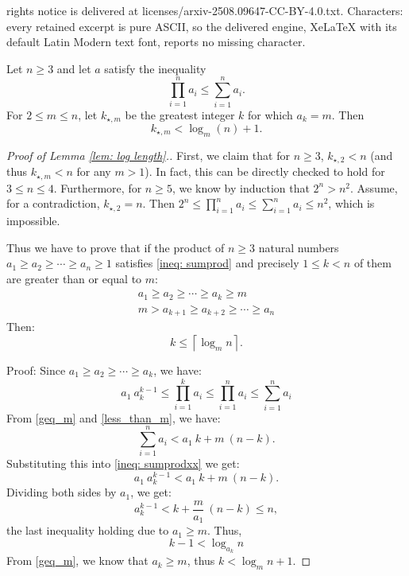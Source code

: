 \documentclass[10pt,a4paper]{amsart}
\newcommand{\ceil}[1]{\left\lceil #1 \right\rceil}
\begin{document}
rights notice is delivered at licenses/arxiv-2508.09647-CC-BY-4.0.txt. Characters: every retained excerpt is pure ASCII, so the delivered engine, XeLaTeX with its default Latin Modern text font, reports no missing character.
\begin{lemma}\label{lem: log length}
Let $n\geq 3$ and let $a$ satisfy the inequality
\begin{equation}\label{ineq: sumprod}
\prod_{i=1}^n a_i\leq\sum_{i=1}^n a_i.
\end{equation}
For $2\leq m\leq n$, let $k_{\star,m}$ be the greatest integer $k$ for which $a_k=m$. Then
\begin{equation}\label{eq: log}
k_{\star,m}< \log_m(n)+1.
\end{equation}
\end{lemma}

\begin{proof}[Proof of Lemma \ref{lem: log length}.]
First, we claim that for $n\geq 3$, $k_{\star,2}<n$ (and thus $k_{\star,m}<n$ for any $m>1$). In fact, this can be directly checked to hold for $3\leq n\leq 4$. Furthermore, for $n\geq 5$, we know by induction that $2^n>n^2$. Assume, for a contradiction, $k_{\star,2}=n$. Then $2^n\leq \prod_{i=1}^n a_i\leq\sum_{i=1}^na_i\leq n^2$, which is impossible. 

Thus we have to prove that if the product of $n \geq 3$ natural numbers $a_1 \geq a_2 \geq \cdots \geq a_n \geq 1$ satisfies \eqref{ineq: sumprod} and precisely $1\leq k<n$ of them are greater than or equal to $m$:
    \begin{gather}
        a_1 \geq a_2 \geq \cdots \geq a_k \geq m \label{geq_m} \\
        m > a_{k+1} \geq a_{k+2} \geq \cdots \geq a_n \label{less_than_m}
    \end{gather}
    Then:
    \[ k \leq \ceil {\log_m n}. \]

Proof: Since $a_1 \geq a_2 \geq \cdots \geq a_k$, we have:
    \begin{equation}\label{ineq: sumprodxx} 
        a_1 \ a_k^{k-1} \leq \prod_{i=1}^k a_i \leq \prod_{i=1}^n a_i\leq  \sum_{i=1}^n a_i
    \end{equation}
    From \eqref{geq_m} and \eqref{less_than_m}, we have:
    \begin{equation}\label{not_strict}
        \sum_{i=1}^n a_i < a_1 \ k +  m \ (n-k).
    \end{equation}
    Substituting this into \eqref{ineq: sumprodxx} we get:
    \[
        a_1 \ a_k^{k-1} < a_1 \ k + m \ (n-k).
    \]
    Dividing both sides by $a_1$, we get:
    \[
        a_k^{k-1} < k + \frac{m}{a_1} \ (n - k)\leq n,
    \]
the last inequality holding due to $a_1 \geq m$. Thus,
    \[
        k-1 < \log_{a_k} n
    \]
    From \eqref{geq_m}, we know that $a_k \geq m$, thus    $k < \log_m n + 1$.
\end{proof}
\end{document}
